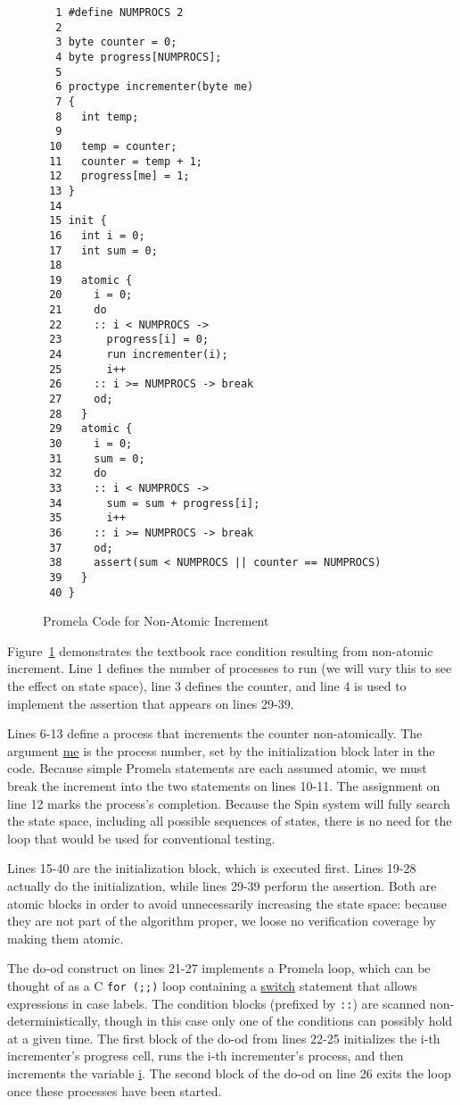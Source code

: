 \begin{figure}[tbp]
{ \scriptsize
\begin{verbatim}
  1 #define NUMPROCS 2
  2 
  3 byte counter = 0;
  4 byte progress[NUMPROCS];
  5 
  6 proctype incrementer(byte me)
  7 {
  8   int temp;
  9 
 10   temp = counter;
 11   counter = temp + 1;
 12   progress[me] = 1;
 13 }
 14 
 15 init {
 16   int i = 0;
 17   int sum = 0;
 18 
 19   atomic {
 20     i = 0;
 21     do
 22     :: i < NUMPROCS ->
 23       progress[i] = 0;
 24       run incrementer(i);
 25       i++
 26     :: i >= NUMPROCS -> break
 27     od;
 28   }
 29   atomic {
 30     i = 0;
 31     sum = 0;
 32     do
 33     :: i < NUMPROCS ->
 34       sum = sum + progress[i];
 35       i++
 36     :: i >= NUMPROCS -> break
 37     od;
 38     assert(sum < NUMPROCS || counter == NUMPROCS)
 39   }
 40 }
\end{verbatim}
}
\caption{Promela Code for Non-Atomic Increment}
\label{fig:analysis:Promela Code for Non-Atomic Increment}
\end{figure}

Figure~\ref{fig:analysis:Promela Code for Non-Atomic Increment}
demonstrates the textbook race condition
resulting from non-atomic increment.
Line 1 defines the number of processes to run (we will vary this
to see the effect on state space), line 3 defines the counter,
and line 4 is used to implement the assertion that appears on
lines 29-39.

Lines 6-13 define a process that increments the counter non-atomically.
The argument \url{me} is the process number, set by the initialization
block later in the code.
Because simple Promela statements are each assumed atomic, we must
break the increment into the two statements on lines 10-11.
The assignment on line 12 marks the process's completion.
Because the Spin system will fully search the state space, including
all possible sequences of states, there is no need for the loop
that would be used for conventional testing.

Lines 15-40 are the initialization block, which is executed first.
Lines 19-28 actually do the initialization, while lines 29-39
perform the assertion.
Both are atomic blocks in order to avoid unnecessarily increasing
the state space: because they are not part of the algorithm proper,
we loose no verification coverage by making them atomic.

The do-od construct on lines 21-27 implements a Promela loop,
which can be thought of as a C {\tt for (;;)} loop containing a
\url{switch} statement that allows expressions in case labels.
The condition blocks (prefixed by {\tt ::})
are scanned non-deterministically,
though in this case only one of the conditions can possibly hold at a given
time.
The first block of the do-od from lines 22-25 initializes the i-th
incrementer's progress cell, runs the i-th incrementer's process, and
then increments the variable \url{i}.
The second block of the do-od on line 26 exits the loop once
these processes have been started.

